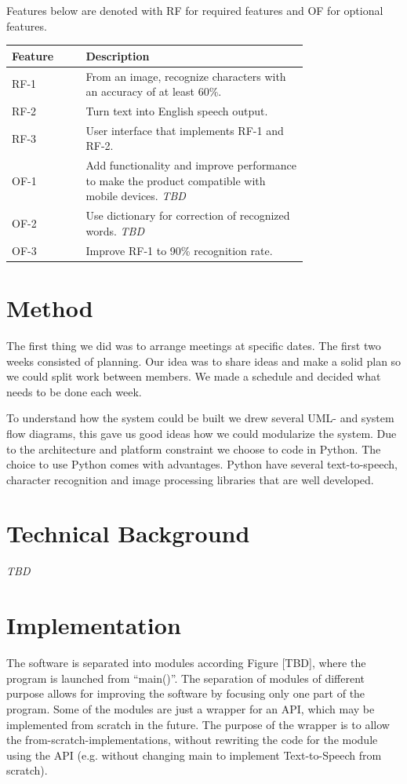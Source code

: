 \documentclass[a4paper, english, abstract=on]{scrartcl}
\begin{document}
Features below are denoted with RF for required features and OF for optional
features.
  \noindent\begin{tabularx}{\linewidth}{X p{0.75\linewidth}}
  \toprule
    \textbf{Feature} & \textbf{Description} \\
  \midrule
  RF-1 &
    From an image, recognize characters with an accuracy of at least 60\%. \\
  RF-2 &
    Turn text into English speech output. \\
  RF-3 &
    User interface that implements RF-1 and RF-2. \\
  OF-1 &
    Add functionality and improve performance to make the product compatible
    with mobile devices. \textit{TBD} \\
  OF-2 &
    Use dictionary for correction of recognized words. \textit{TBD} \\
  OF-3 &
    Improve RF-1 to 90\% recognition rate. \\
  \bottomrule
  \end{tabularx}

\section{Method}
The first thing we did was to arrange meetings at specific dates. The first
two weeks consisted of planning. Our idea was to share ideas and make a solid
plan so we could split work between members. We made a schedule and decided
what needs to be done each week. 

To understand how the system could be built we drew several UML- and system
flow diagrams, this gave us good ideas how we could modularize the system. Due
to the architecture and platform constraint we choose to code in Python. The
choice to use Python comes with advantages. Python have several 
text-to-speech, character recognition and image processing libraries that are
well developed.

\section{Technical Background}
\textit{TBD}

\section{Implementation}
The software is separated into modules according Figure [TBD], where the
program is launched from “main()”. The separation of modules of different
purpose allows for improving the software by focusing only one part of the
program. Some of the modules are just a wrapper for an API, which may be
implemented from scratch in the future. The purpose of the wrapper is to allow
the from-scratch-implementations, without rewriting the code for the module
using the API (e.g. without changing main to implement Text-to-Speech from
scratch).
\end{document}
